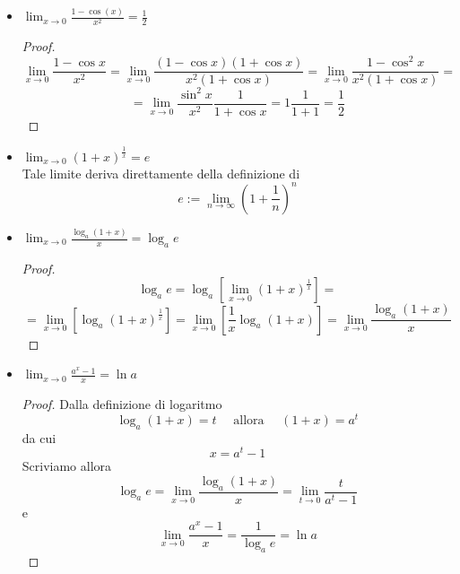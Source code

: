 \documentclass[]{report}
\theoremstyle{definition}
\theoremstyle{remark}
\theoremstyle{plain}
\numberwithin{equation}{chapter}
\begin{document}
\begin{itemize}
\begin{proof}
	\end{proof}
	\item $\displaystyle \lim_{x \to 0} \frac{1 - \cos(x)}{x^2} = \frac{1}{2}$
	\begin{proof}
		$$\lim_{x \to 0} \frac{1 - \cos x}{x^2} = \lim_{x \to 0} \frac{(1 - \cos x)(1 + \cos x)}{x^2(1 + \cos x)}= \lim_{x \to 0} \frac{1-\cos^2 x}{x^2(1 + \cos x)}=$$
		$$=\lim_{x \to 0}\frac{\sin^2 x}{x^2}\frac{1}{1+\cos x}=1 \frac{1}{1+1}=\frac{1}{2}$$
	\end{proof}
	\item $\displaystyle \lim_{x \to 0} (1+x)^{\frac{1}{x}} = \mathit{e}$ \\
	Tale limite deriva direttamente della definizione di 
	$$\mathit{e}:=\lim_{n \to \infty}(1+\frac{1}{n})^n$$
	\item $\displaystyle \lim_{x \to 0} \frac{\log_{a}(1+x)}{x} = \log_{a}\mathit{e}$
	\begin{proof}
		$$\log_{a}\mathit{e}=\log_{a}\left[ \lim_{x \to 0}(1+x)^{\frac{1}{x}}\right]=$$
		$$=\lim_{x \to 0}\left[\log_{a}(1+x)^{\frac{1}{x}}\right]=\lim_{x \to 0}\left[{\frac{1}{x}}\log_{a}(1+x)\right]=\lim_{x \to 0}\frac{\log_{a}(1+x)}{x}$$
	\end{proof}
	\item $\displaystyle \lim_{x \to 0} \frac{a^x-1}{x} = \ln a$
	\begin{proof}
		Dalla definizione di logaritmo
		$$\log_{a}(1+x)=t \quad \textrm{ allora } \quad (1+x)=a^t $$
		da cui
		$$x=a^t-1$$
		Scriviamo allora
		$$\log_{a}\mathit{e}=\lim_{x \to 0}\frac{\log_a(1+x)}{x}=\lim_{t \to 0}\frac{t}{a^t-1}$$
		e
		$$\lim_{x \to 0} \frac{a^x-1}{x}=\frac{1}{\log_{a}e}=\ln a$$
	\end{proof}
\end{itemize}




\end{document}
